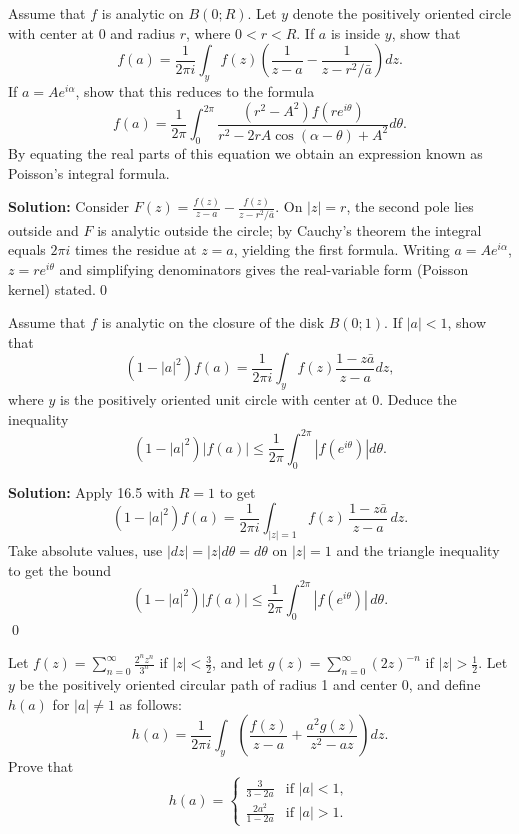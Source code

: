 \begin{problembox}
Assume that \( f \) is analytic on \( B(0; R) \). Let \( y \) denote the positively oriented circle with center at 0 and radius \( r \), where \( 0 < r < R \). If \( a \) is inside \( y \), show that
\[f(a) = \frac{1}{2\pi i} \int_{y} f(z) \left( \frac{1}{z - a} - \frac{1}{z - r^2 / \bar{a}} \right) dz.\]
If \( a = Ae^{i\alpha} \), show that this reduces to the formula
\[f(a) = \frac{1}{2\pi} \int_0^{2\pi} \frac{(r^2 - A^2)f(re^{i\theta})}{r^2 - 2rA \cos (\alpha - \theta) + A^2} d\theta.\]
By equating the real parts of this equation we obtain an expression known as Poisson's integral formula.
\end{problembox}

\bigskip\noindent\textbf{Solution:}
Consider $F(z)=\frac{f(z)}{z-a}-\frac{f(z)}{z-r^2/\bar a}$. On $|z|=r$, the second pole lies outside and $F$ is analytic outside the circle; by Cauchy's theorem the integral equals $2\pi i$ times the residue at $z=a$, yielding the first formula. Writing $a=Ae^{i\alpha}$, $z=re^{i\theta}$ and simplifying denominators gives the real-variable form (Poisson kernel) stated.\qed


\begin{problembox}
Assume that \( f \) is analytic on the closure of the disk \( B(0; 1) \). If \( |a| < 1 \), show that
\[(1 - |a|^2)f(a) = \frac{1}{2\pi i} \int_{y} f(z) \frac{1 - z\bar{a}}{z - a} dz,\]
where \( y \) is the positively oriented unit circle with center at 0. Deduce the inequality
\[(1 - |a|^2) |f(a)| \leq \frac{1}{2\pi} \int_0^{2\pi} |f(e^{i\theta})| d\theta.\]
\end{problembox}

\bigskip\noindent\textbf{Solution:}
Apply 16.5 with $R=1$ to get
\[(1-|a|^2)f(a)=\frac{1}{2\pi i}\int_{|z|=1} f(z)\,\frac{1-z\bar a}{z-a}\,dz.\]
Take absolute values, use $|dz|=|z|d\theta=d\theta$ on $|z|=1$ and the triangle inequality to get the bound
\[(1-|a|^2)|f(a)|\le \frac{1}{2\pi}\int_0^{2\pi}|f(e^{i\theta})|\,d\theta.\]\qed


\begin{problembox}
Let \( f(z) = \sum_{n=0}^{\infty} \frac{2^n z^n}{3^n} \) if \( |z| < \frac{3}{2} \), and let \( g(z) = \sum_{n=0}^{\infty} (2z)^{-n} \) if \( |z| > \frac{1}{2} \). Let \( y \) be the positively oriented circular path of radius 1 and center 0, and define \( h(a) \) for \( |a| \neq 1 \) as follows:
\[h(a) = \frac{1}{2\pi i} \int_y \left( \frac{f(z)}{z - a} + \frac{a^2 g(z)}{z^2 - az} \right) dz.\]
Prove that
\[h(a) = \begin{cases} 
\frac{3}{3 - 2a} & \text{if } |a| < 1, \\ 
\frac{2a^2}{1 - 2a} & \text{if } |a| > 1.
\end{cases}\]
\end{problembox}

